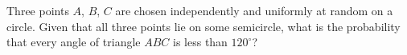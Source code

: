 Three points \(A\), \(B\), \(C\) are chosen independently and uniformly at random on a circle. Given that all three points lie on some semicircle, what is the probability that every angle of triangle \(ABC\) is less than \(120^\circ\)?

